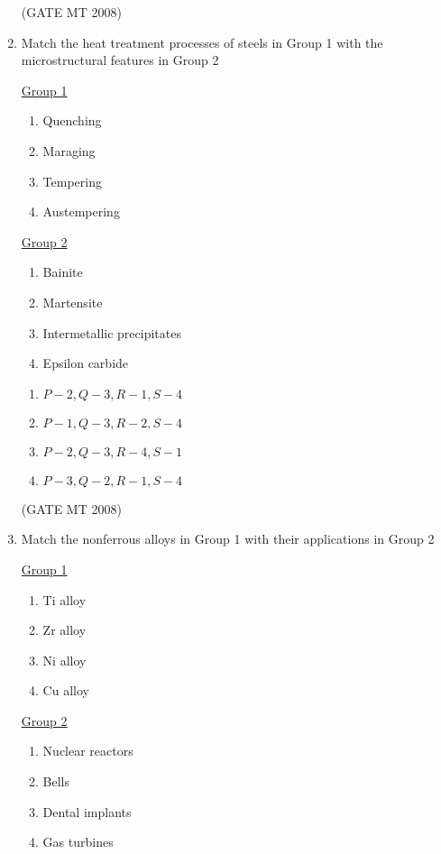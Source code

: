 \documentclass[journal, 11pt, onecolumn]{IEEEtran}
\theoremstyle{remark}
\begin{document}
\begin{enumerate}
\hfill(GATE MT 2008) 

\item Match the heat treatment processes of steels in Group 1 with the microstructural features in Group 2
\begin{multicols}{2}
\underline{Group 1}
\begin{enumerate}[label=(\Alph*), start=16]
\item Quenching
\item Maraging 
\item Tempering
\item Austempering
\end{enumerate}

\underline{Group 2}
\begin{enumerate}[label=(\arabic*), start=1]
\item Bainite
\item Martensite
\item Intermetallic precipitates
\item Epsilon carbide
\end{enumerate}
\end{multicols}

\begin{multicols}{2}
\begin{enumerate} 
\item $P-2, Q-3, R-1, S-4$
\item $P-1, Q-3, R-2, S-4$
\item $P-2, Q-3, R-4, S-1$
\item $P-3, Q-2, R-1, S-4$
\end{enumerate}
\end{multicols}

\hfill(GATE MT 2008) 

\item Match the nonferrous alloys in Group 1 with their applications in Group 2
\begin{multicols}{2}
\underline{Group 1}
\begin{enumerate}[label=(\Alph*), start=16]
\item Ti alloy
\item Zr alloy
\item Ni alloy
\item Cu alloy
\end{enumerate}

\underline{Group 2}
\begin{enumerate}[label=(\arabic*), start=1]
\item Nuclear reactors
\item Bells
\item Dental implants 
\item Gas turbines
\end{enumerate}
\end{multicols}


\end{enumerate}
\end{document}
